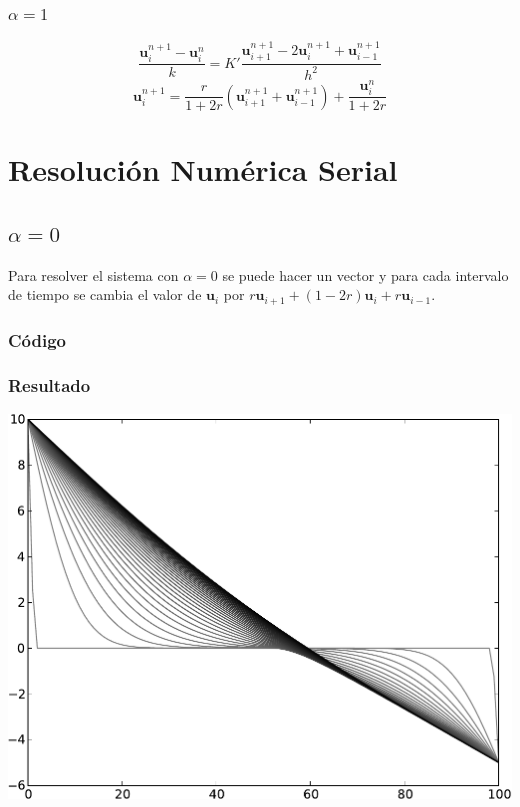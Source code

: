 \documentclass[12pt, a4paper]{article}
\begin{document}
			\subsubsection{$\alpha=1$}
				$$\frac{\mathbf{u}_i^{n+1}-\mathbf{u}_i^n}{k}=K'\frac{\mathbf{u}_{i+1}^{n+1}-2\mathbf{u}_i^{n+1}+\mathbf{u}_{i-1}^{n+1}}{h^2}$$
				$$\mathbf{u}_i^{n+1}=\frac{r}{1+2r}(\mathbf{u}_{i+1}^{n+1}+\mathbf{u}_{i-1}^{n+1}) + \frac{\mathbf{u}_i^n}{1+2r}$$
	
	\section{Resolución Numérica Serial}		
		\subsection{$\alpha=0$}
			Para resolver el sistema con $\alpha=0$ se puede hacer un vector y para cada intervalo de tiempo se cambia el valor de $\mathbf{u}_i$ por $r\mathbf{u}_{i+1}+(1-2r)\mathbf{u}_i+r\mathbf{u}_{i-1}$.
		
			\subsubsection{Código}
				
			
			\subsubsection{Resultado}
				\begin{center}\includegraphics[width=.9\textwidth]{alpha0.pdf}\end{center}
				
\end{document}
